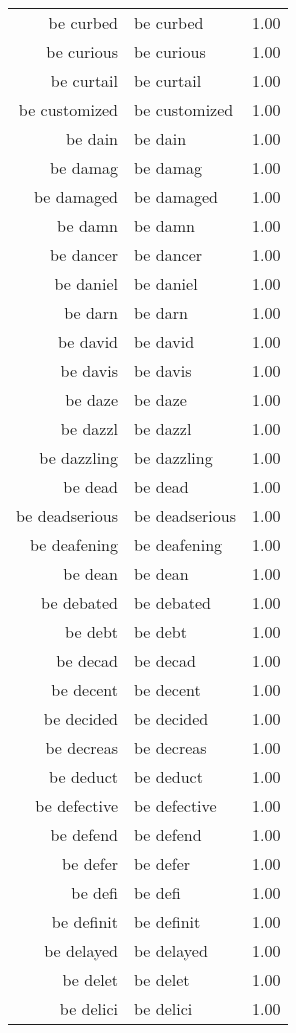 \begin{table}[ht]
\begin{tabular}{rlr}
  be curbed & be curbed & 1.00 \\ 
  be curious & be curious & 1.00 \\ 
  be curtail & be curtail & 1.00 \\ 
  be customized & be customized & 1.00 \\ 
  be dain & be dain & 1.00 \\ 
  be damag & be damag & 1.00 \\ 
  be damaged & be damaged & 1.00 \\ 
  be damn & be damn & 1.00 \\ 
  be dancer & be dancer & 1.00 \\ 
  be daniel & be daniel & 1.00 \\ 
  be darn & be darn & 1.00 \\ 
  be david & be david & 1.00 \\ 
  be davis & be davis & 1.00 \\ 
  be daze & be daze & 1.00 \\ 
  be dazzl & be dazzl & 1.00 \\ 
  be dazzling & be dazzling & 1.00 \\ 
  be dead & be dead & 1.00 \\ 
  be deadserious & be deadserious & 1.00 \\ 
  be deafening & be deafening & 1.00 \\ 
  be dean & be dean & 1.00 \\ 
  be debated & be debated & 1.00 \\ 
  be debt & be debt & 1.00 \\ 
  be decad & be decad & 1.00 \\ 
  be decent & be decent & 1.00 \\ 
  be decided & be decided & 1.00 \\ 
  be decreas & be decreas & 1.00 \\ 
  be deduct & be deduct & 1.00 \\ 
  be defective & be defective & 1.00 \\ 
  be defend & be defend & 1.00 \\ 
  be defer & be defer & 1.00 \\ 
  be defi & be defi & 1.00 \\ 
  be definit & be definit & 1.00 \\ 
  be delayed & be delayed & 1.00 \\ 
  be delet & be delet & 1.00 \\ 
  be delici & be delici & 1.00 \\ 

\end{tabular}
\end{table}
